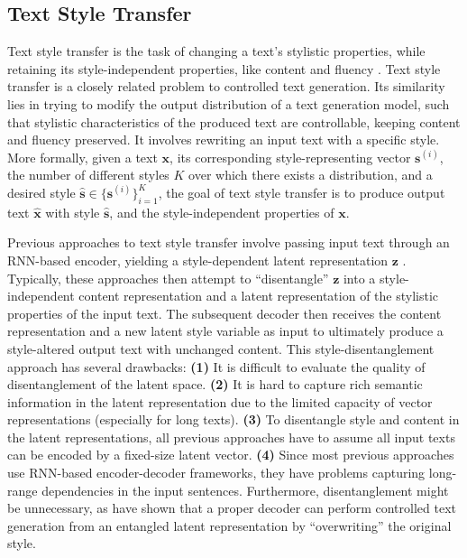\subsection{Text Style Transfer}
Text style transfer is the task of changing a text's stylistic properties, while retaining its style-independent properties, like content and fluency \citep{dai2019style}. Text style transfer is a closely related problem to controlled text generation. Its similarity lies in trying to modify the output distribution of a text generation model, such that stylistic characteristics of the produced text are controllable, keeping content and fluency preserved. It involves rewriting an input text with a specific style. More formally, given a text $\textbf{x}$, its corresponding style-representing vector $\textbf{s}^{(i)}$, the number of different styles $K$ over which there exists a distribution, and a desired style $\hat{\textbf{s}} \in \{\textbf{s}^{(i)}\}_{i = 1}^{K}$, the goal of text style transfer is to produce output text $\hat{\textbf{x}}$ with style $\hat{\textbf{s}}$, and the style-independent properties of $\textbf{x}$. 

Previous approaches to text style transfer involve passing input text through an RNN-based encoder, yielding a style-dependent latent representation $\textbf{z}$ \citep{zhang2018styletranslation}. Typically, these approaches then attempt to ``disentangle'' $\textbf{z}$ into a style-independent content representation and a latent representation of the stylistic properties of the input text. The subsequent decoder then receives the content representation and a new latent style variable as input to ultimately produce a style-altered output text with unchanged content. This style-disentanglement approach has several drawbacks: \textbf{(1)} It is difficult to evaluate the quality of disentanglement of the latent space. \textbf{(2)} It is hard to capture rich semantic information in the latent representation due to the limited capacity of vector representations (especially for long texts). \textbf{(3)} To disentangle style and content in the latent representations, all previous approaches have to assume all input texts can be encoded by a fixed-size latent vector. \textbf{(4)} Since most previous approaches use RNN-based encoder-decoder frameworks, they have problems capturing long-range dependencies in the input sentences. Furthermore, disentanglement might be unnecessary, as \cite{lample2018multipleattribute} have shown that a proper decoder can perform controlled text generation from an entangled latent representation by ``overwriting'' the original style.

